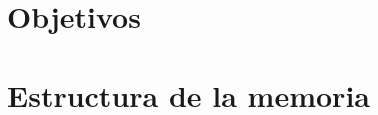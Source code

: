 \documentclass[12pt,a4paper]{article}
\begin{document}
%	
	\section{Objetivos}\label{Objetivos}
		
	\section{Estructura de la memoria}\label{Estructura}
		
\newpage
\end{document}
